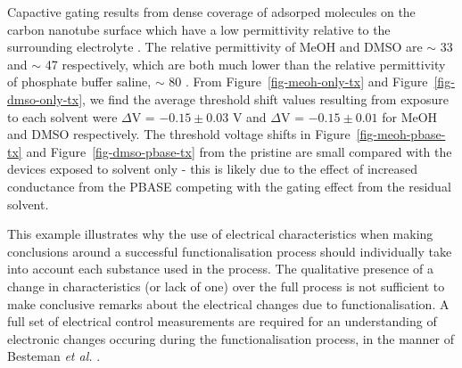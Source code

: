 \documentclass[
  a4paper,
]{scrbook}
\begin{document}
Capactive gating results from dense coverage of adsorped molecules on
the carbon nanotube surface which have a low permittivity relative to
the surrounding electrolyte \autocite{Heller2008}. The relative
permittivity of MeOH and DMSO are \(\sim\) 33 \autocite{Mohsen-Nia2010}
and \(\sim\) 47 \autocite{Hunger2010} respectively, which are both much
lower than the relative permittivity of phosphate buffer saline,
\(\sim\) 80 \autocite{Shkodra2021}. From Figure~\ref{fig-meoh-only-tx}
and Figure~\ref{fig-dmso-only-tx}, we find the average threshold shift
values resulting from exposure to each solvent were \(\Delta\)V =
\(-0.15 \pm 0.03\) V and \(\Delta\)V = \(-0.15 \pm 0.01\) for MeOH and
DMSO respectively. The threshold voltage shifts in
Figure~\ref{fig-meoh-pbase-tx} and Figure~\ref{fig-dmso-pbase-tx} from
the pristine are small compared with the devices exposed to solvent only
- this is likely due to the effect of increased conductance from the
PBASE competing with the gating effect from the residual solvent.

This example illustrates why the use of electrical characteristics when
making conclusions around a successful functionalisation process should
individually take into account each substance used in the process. The
qualitative presence of a change in characteristics (or lack of one)
over the full process is not sufficient to make conclusive remarks about
the electrical changes due to functionalisation. A full set of
electrical control measurements are required for an understanding of
electronic changes occuring during the functionalisation process, in the
manner of Besteman \emph{et al.} \autocite{Besteman2003}.

\newpage
{}

\hfill\break
\hfill\break
\end{document}
